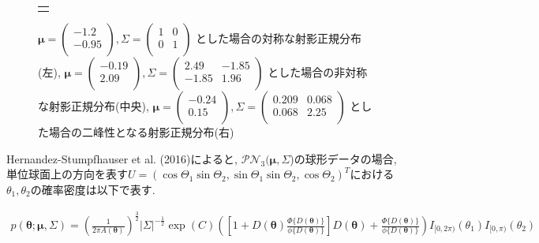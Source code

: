 \documentclass[a4j,11pt]{jarticle}
\begin{document}
\begin{figure}[h]
\begin{tabular}{c}
\begin{minipage}{0.33\hsize}
\begin{center}
  \end{center}
 \end{minipage}
  \end{tabular}
\caption[Text excluding the matrix]{
$\bm \mu = \begin{pmatrix} -1.2 \\ -0.95 \\ \end{pmatrix}, \Sigma = \begin{pmatrix}  1 & 0 \\ 0 & 1 \\ \end{pmatrix}$
とした場合の対称な射影正規分布(左), 
$\bm \mu = \begin{pmatrix} -0.19 \\ 2.09 \\ \end{pmatrix}, \Sigma = \begin{pmatrix} 2.49 & -1.85 \\ -1.85 & 1.96 \\ \end{pmatrix}$ とした場合の非対称な射影正規分布(中央), 
$\bm \mu = \begin{pmatrix} -0.24 \\ 0.15 \\ \end{pmatrix}, \Sigma = \begin{pmatrix}  0.209 & 0.068\\ 0.068 & 2.25 \\ \end{pmatrix}$ とした場合の二峰性となる射影正規分布(右)}
\label{sample_pn}
\end{figure}


Hernandez-Stumpfhauser et al. (2016)によると, $\mathcal{PN}_3(\bm \mu,\Sigma$)の球形データの場合, 単位球面上の方向を表す$U = (\cos\Theta_1 \sin \Theta_2, \sin\Theta_1 \sin \Theta_2, \cos \Theta_2)^T$における$\theta_1, \theta_2$の確率密度は以下で表す.

\vspace{-1zh}
\begin{eqnarray*}
\label{PNS}
p(\bm \theta; \bm \mu, \Sigma) = \left(\frac{1}{2\pi A(\bm \theta)}\right)^{\frac{3}{2}} |\Sigma|^{-\frac{1}{2}}
\exp(C)\left( \left[1 + D(\bm \theta) \frac{\Phi \{D(\bm \theta)\}}{\phi \{D(\bm \theta)\}} \right] D(\bm \theta) + \frac{\Phi \{D(\bm \theta)\}}{\phi \{D(\bm \theta)\}} \right) I_{[0,2\pi)}(\theta_1) I_{[0,\pi)}(\theta_2)
\end{eqnarray*}
\end{document}
